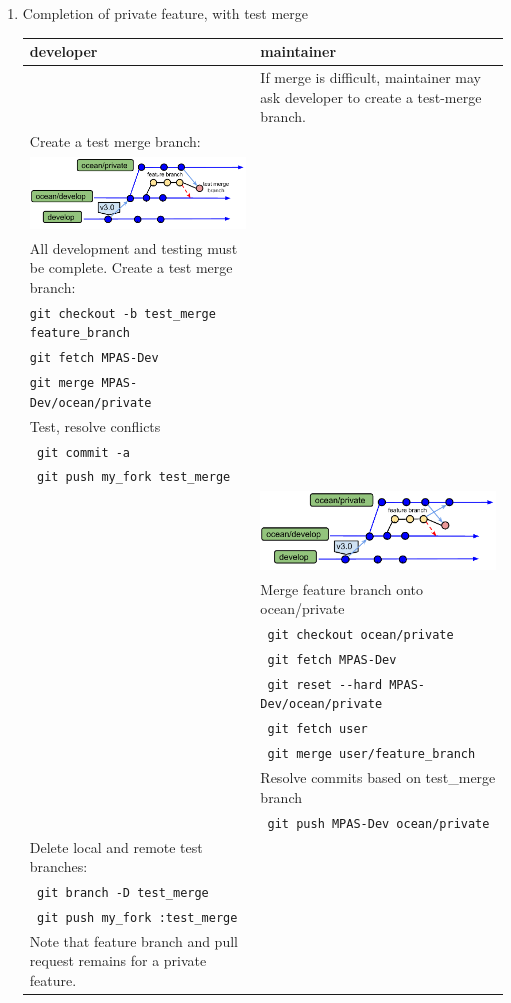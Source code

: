 \documentclass[11pt]{article}
\begin{document}
\begin{enumerate}
\clearpage
\item Completion of private feature, with test merge

\begin{centering}
\end{centering}
 \begin{tabular}[c]{L{3.3in}|L{3.3in}}
developer & maintainer \\
\hline
& If merge is difficult, maintainer may ask developer to create a test-merge branch.\\
Create a test merge branch: \\
\includegraphics[width=3.25in]{f/MPASworkflow_4d.pdf} \\
All development and testing must be complete.
Create a test merge branch: \\
\verb|git checkout -b test_merge feature_branch|  \\
\verb|git fetch MPAS-Dev| \\
\verb|git merge MPAS-Dev/ocean/private|  \\
Test, resolve conflicts \\
\verb| git commit -a|  \\
\verb| git push my_fork test_merge| \\
& \includegraphics[width=3.25in]{f/MPASworkflow_4.pdf} \\
& Merge feature branch onto ocean/private \\
& \verb| git checkout ocean/private| \\
& \verb| git fetch MPAS-Dev| \\
& \verb| git reset --hard MPAS-Dev/ocean/private | \\
& \verb| git fetch user| \\
& \verb| git merge user/feature_branch| \\
& Resolve commits based on test\_merge branch \\
& \verb| git push MPAS-Dev ocean/private| \\
Delete local and remote test branches: \\
\verb| git branch -D test_merge|  \\
\verb| git push my_fork :test_merge| \\
Note that feature branch and pull request remains for a private feature.
 \end{tabular}



\end{enumerate}
\end{document}
